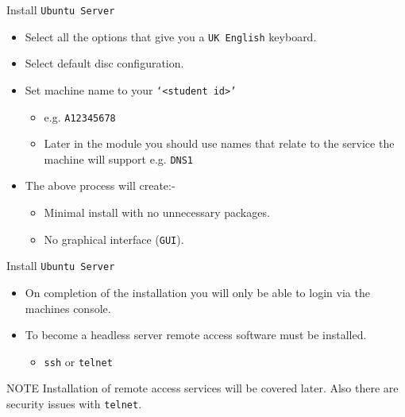 \documentclass{beamer}
\begin{document}
\begin{frame}{Install \texttt{Ubuntu Server}}
  \begin{itemize}
    \item Select all the options that give you a \texttt{UK English} keyboard.
    \item Select default disc configuration.
    \item Set machine name to your \texttt{`<student id>'}
      \begin{itemize}
        \item e.g. \texttt{A12345678}
        \item Later in the module you should use names that relate to the service the machine will support e.g. \texttt{DNS1}
      \end{itemize}
    \item The above process will create:-
      \begin{itemize}
        \item Minimal install with no unnecessary packages.
        \item No graphical interface (\texttt{GUI}).
      \end{itemize}
  \end{itemize}
\end{frame}

\begin{frame}{Install \texttt{Ubuntu Server}}
  \begin{itemize}
    \item On completion of the installation you will only be able to login via the machines console.
    \item To become a headless server remote access software must be installed.
      \begin{itemize}
        \item \texttt{ssh} or \texttt{telnet}
      \end{itemize}
  \end{itemize}
  \begin{block}{NOTE}
    Installation of remote access services will be covered later. Also there are security issues with \texttt{telnet}. 
  \end{block}
\end{frame}
\end{document}
